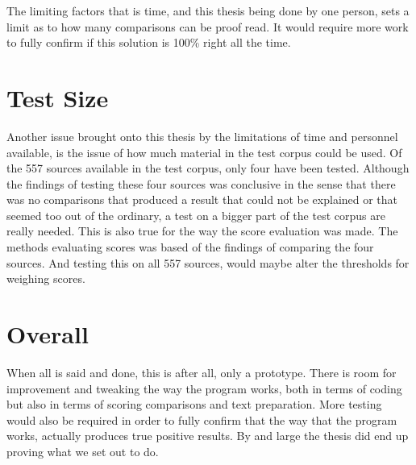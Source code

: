 The limiting factors that is time, and this thesis being done by one person, sets a limit as to how many comparisons can be proof read. It would require more work to fully confirm if this solution is 100\% right all the time.

\section{Test Size}
Another issue brought onto this thesis by the limitations of time and personnel available, is the issue of how much material in the test corpus could be used. Of the 557 sources available in the test corpus, only four have been tested. Although the findings of testing these four sources was conclusive in the sense that there was no comparisons that produced a result that could not be explained or that seemed too out of the ordinary, a test on a bigger part of the test corpus are really needed. This is also true for the way the score evaluation was made. The methods evaluating scores was based of the findings of comparing the four sources. And testing this on all 557 sources, would maybe alter the thresholds for weighing scores.

\section{Overall}
When all is said and done, this is after all, only a prototype. There is room for improvement and tweaking the way the program works, both in terms of coding but also in terms of scoring comparisons and text preparation. More testing would also be required in order to fully confirm that the way that the program works, actually produces true positive results. By and large the thesis did end up proving what we set out to do.